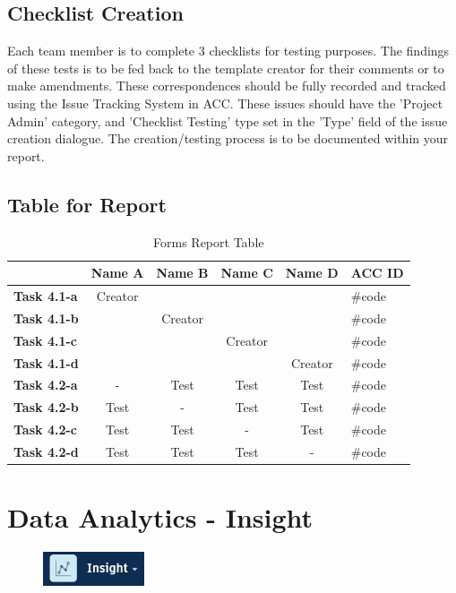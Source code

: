 \subsection{Checklist Creation}

Each team member is to complete 3 checklists for testing purposes.  The findings of these tests is to be fed back to the template creator for their comments or to make amendments.  These correspondences should be fully recorded and tracked using the Issue Tracking System in ACC. These issues should have the 'Project Admin' category, and 'Checklist Testing' type set in the 'Type' field of the issue creation dialogue.  The creation/testing process is to be documented within your report.  

\subsection{Table for Report}

\begin{table}[ht]
	\centering
	\begin{tabular}{|l|c|c|c|c|l|}
		\hline
		& \textbf{Name A} & \textbf{Name B} & \textbf{Name C} & \textbf{Name D} & \textbf{ACC ID}\\
		\hline
		\textbf{Task 4.1-a} &  Creator &  &  &  & \#code\\
		\textbf{Task 4.1-b} &  & Creator &  &  & \#code\\
		\textbf{Task 4.1-c} &  &  & Creator &  & \#code\\
		\textbf{Task 4.1-d} &  &  &  & Creator & \#code\\
		\hline
		\textbf{Task 4.2-a} & - & Test & Test & Test & \#code\\
		\textbf{Task 4.2-b} & Test & - & Test & Test & \#code\\
		\textbf{Task 4.2-c} & Test & Test & - & Test & \#code\\
		\textbf{Task 4.2-d} & Test & Test & Test & - & \#code\\
		\hline
	\end{tabular}
	\caption{Forms Report Table }
	\label{tab:field-items}
\end{table}


\newpage

\section{Data Analytics - Insight}

\begin{figure}[h!t]
	\includegraphics[height=1.0cm]{RevitAssets/insight}
	\label{fig:insight}
\end{figure}



